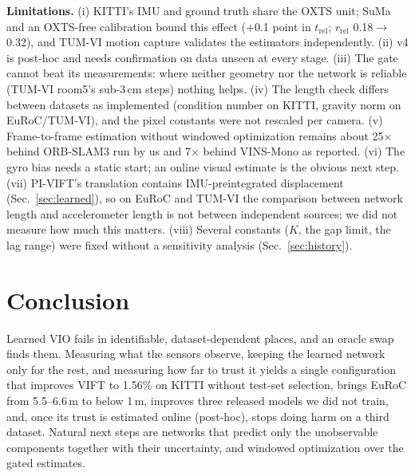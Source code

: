 \documentclass[letterpaper,journal]{IEEEtran}
\begin{document}
\textbf{Limitations.} (i) KITTI's IMU and ground truth share the OXTS unit; SuMa and an OXTS-free calibration bound this effect (+0.1 point in $t_\mathrm{rel}$; $r_\mathrm{rel}$ 0.18$\to$0.32), and TUM-VI motion capture validates the estimators independently. (ii) v4 is post-hoc and needs confirmation on data unseen at every stage. (iii) The gate cannot beat its measurements: where neither geometry nor the network is reliable (TUM-VI room5's sub-3\,cm steps) nothing helps. (iv) The length check differs between datasets as implemented (condition number on KITTI, gravity norm on EuRoC/TUM-VI), and the pixel constants were not rescaled per camera. (v) Frame-to-frame estimation without windowed optimization remains about 25$\times$ behind ORB-SLAM3 run by us and 7$\times$ behind VINS-Mono as reported. (vi) The gyro bias needs a static start; an online visual estimate is the obvious next step. (vii) PI-VIFT's translation contains IMU-preintegrated displacement (Sec.~\ref{sec:learned}), so on EuRoC and TUM-VI the comparison between network length and accelerometer length is not between independent sources; we did not measure how much this matters. (viii) Several constants ($K$, the gap limit, the lag range) were fixed without a sensitivity analysis (Sec.~\ref{sec:history}).

\section{Conclusion}

Learned VIO fails in identifiable, dataset-dependent places, and an oracle swap finds them. Measuring what the sensors observe, keeping the learned network only for the rest, and measuring how far to trust it yields a single configuration that improves VIFT to 1.56\% on KITTI without test-set selection, brings EuRoC from 5.5--6.6\,m to below 1\,m, improves three released models we did not train, and, once its trust is estimated online (post-hoc), stops doing harm on a third dataset. Natural next steps are networks that predict only the unobservable components together with their uncertainty, and windowed optimization over the gated estimates.



\end{document}
